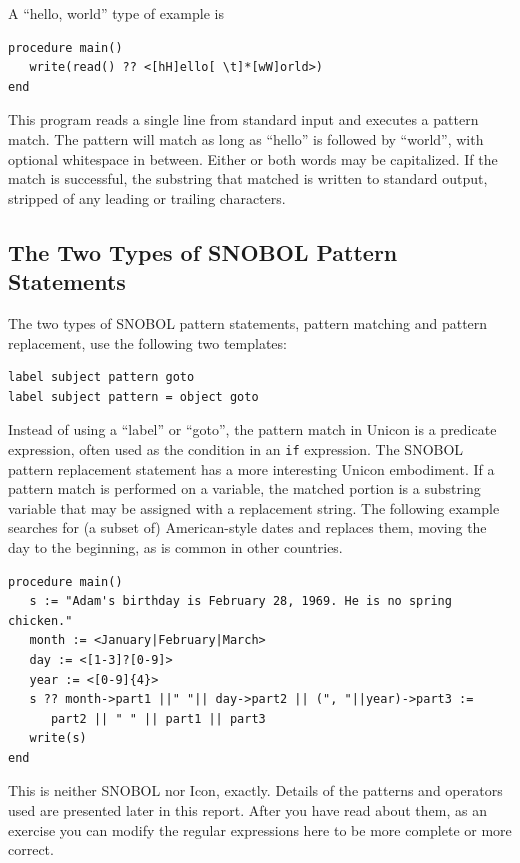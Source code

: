 \documentclass[letterpaper,12pt]{article}
\begin{document}
A ``hello, world'' type of example is

\begin{verbatim}
procedure main()
   write(read() ?? <[hH]ello[ \t]*[wW]orld>)
end
\end{verbatim}

This program reads a single line from standard input and executes a
pattern match. The pattern will match as long as ``hello'' is followed
by ``world'', with optional whitespace in between. Either or both
words may be capitalized. If the match is successful, the substring
that matched is written to standard output, stripped of any leading
or trailing characters.

\subsection{The Two Types of SNOBOL Pattern Statements}

The two types of SNOBOL pattern statements, pattern matching and
pattern replacement, use the following two templates:

\begin{verbatim}
label subject pattern goto
label subject pattern = object goto
\end{verbatim}

Instead of using a ``label'' or ``goto'', the pattern match in Unicon
is a predicate expression, often used as the condition in an \texttt{if}
expression.  The SNOBOL pattern replacement statement has a more
interesting Unicon embodiment.  If a pattern match is performed on a
variable, the matched portion is a substring variable that may be
assigned with a replacement string.  The following example searches
for (a subset of) American-style dates and replaces them, moving the
day to the beginning, as is common in other countries.

\begin{verbatim}
procedure main()
   s := "Adam's birthday is February 28, 1969. He is no spring chicken."
   month := <January|February|March>
   day := <[1-3]?[0-9]>
   year := <[0-9]{4}>
   s ?? month->part1 ||" "|| day->part2 || (", "||year)->part3 :=
      part2 || " " || part1 || part3
   write(s)
end
\end{verbatim}

This is neither SNOBOL nor Icon, exactly.  Details of the patterns and
operators used are presented later in this report. After you have read
about them, as an exercise you can modify the regular expressions here to
be more complete or more correct.
\end{document}
